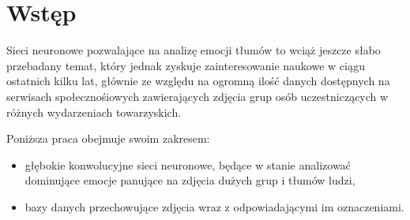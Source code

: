 \chapter{Wstęp}
\thispagestyle{chapterBeginStyle}


  


Sieci neuronowe pozwalające na analizę emocji tłumów to wciąż jeszcze słabo przebadany temat, który jednak zyskuje zainteresowanie naukowe w ciągu ostatnich kilku lat, głównie ze względu na ogromną ilość danych dostępnych na serwisach społecznośiowych zawierających zdjęcia grup osób uczestniczących w różnych wydarzeniach towarzyskich.

Poniższa praca obejmuje swoim zakresem:
\begin{itemize}
    \item głębokie konwolucyjne sieci neuronowe, będące w stanie analizować dominujące emocje panujące na zdjęcia dużych grup i tłumów ludzi,
    \item bazy danych przechowujące zdjęcia wraz z odpowiadającymi im oznaczeniami.
\end{itemize}

